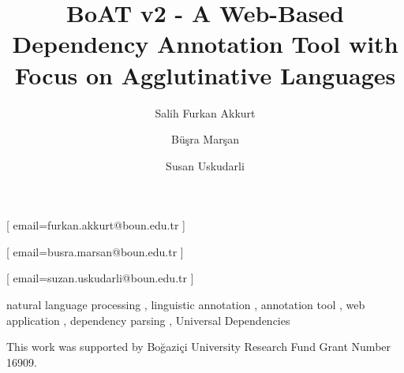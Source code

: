 \documentclass[ ]{ceurart}
\begin{document}


\title{BoAT v2 - A Web-Based Dependency Annotation Tool with Focus on Agglutinative Languages}

\author[1]{Salih Furkan Akkurt}[%
email=furkan.akkurt@boun.edu.tr
]

\author[2]{Büşra Marşan}[%
email=busra.marsan@boun.edu.tr
]

\author[1]{Susan Uskudarli}[%
email=suzan.uskudarli@boun.edu.tr
]

\address[1]{ Department of Computer Engineering, Boğaziçi University, İstanbul, Turkey }
\address[2]{ Department of Linguistics, Boğaziçi University, İstanbul, Turkey }



\begin{keywords}
natural language processing \sep
linguistic annotation \sep
annotation tool \sep
web application \sep
dependency parsing \sep
Universal Dependencies
\end{keywords}

\maketitle









\begin{acknowledgments}
This work was supported by Boğaziçi University Research Fund Grant Number 16909.
\end{acknowledgments}


\end{document}
